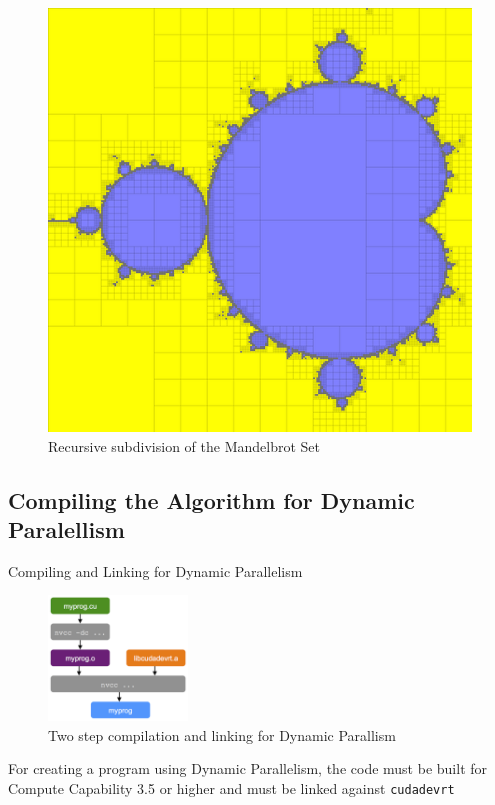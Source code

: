 \documentclass[fleqn,11pt,aspectratio=43]{beamer}
\begin{document}
\begin{frame}
	\begin{figure}
		\includegraphics[height=0.9\textheight]{mariani-silver-subdivision.png}
		\caption{Recursive subdivision of the Mandelbrot Set}
	\end{figure}
\end{frame}

\subsection{Compiling the Algorithm for Dynamic Paralellism}

\begin{frame}{Compiling and Linking for Dynamic Parallelism}
	\begin{figure}
		\includegraphics[width=0.33\textwidth]{dyn-compile-link.png}
		\caption{Two step compilation and linking for Dynamic Parallism}
	\end{figure}
	For creating a program using Dynamic Parallelism, the code must be built for Compute Capability 3.5 or higher and must be linked against \texttt{cudadevrt}
\end{frame}
\end{document}

